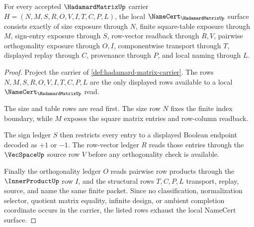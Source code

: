 \begin{theorem}
\label{thm:hadamard-matrix-namecert-obligations}
For every accepted $\HadamardMatrixUp$ carrier $H=(N,M,S,R,O,V,I,T,C,P,L)$, the local $\NameCert_{\HadamardMatrixUp}$ surface consists exactly of size exposure through $N$, finite square-table exposure through $M$, sign-entry exposure through $S$, row-vector readback through $R,V$, pairwise orthogonality exposure through $O,I$, componentwise transport through $T$, displayed replay through $C$, provenance through $P$, and local naming through $L$.
\end{theorem}
\begin{proof}
Project the carrier of \autoref{def:hadamard-matrix-carrier}. The rows $N,M,S,R,O,V,I,T,C,P,L$ are the only displayed rows available to a local $\NameCert_{\HadamardMatrixUp}$ read.

The size and table rows are read first. The size row $N$ fixes the finite index boundary, while $M$ exposes the square matrix entries and row-column readback.

The sign ledger $S$ then restricts every entry to a displayed Boolean endpoint decoded as $+1$ or $-1$. The row-vector ledger $R$ reads those entries through the $\VecSpaceUp$ source row $V$ before any orthogonality check is available.

Finally the orthogonality ledger $O$ reads pairwise row products through the $\InnerProductUp$ row $I$, and the structural rows $T,C,P,L$ transport, replay, source, and name the same finite packet. Since no classification, normalization selector, quotient matrix equality, infinite design, or ambient completion coordinate occurs in the carrier, the listed rows exhaust the local NameCert surface.
\end{proof}

